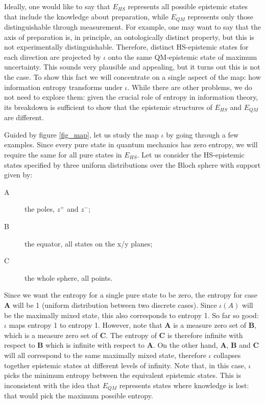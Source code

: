 \documentclass[twocolumn,prl,floatfix,superscriptaddress]{revtex4-2}
\begin{document}
Ideally, one would like to say that $E_{HS}$ represents all possible epistemic states that include the knowledge about preparation, while $E_{QM}$ represents only those distinguishable through measurement. For example, one may want to say that the axis of preparation is, in principle, an ontologically distinct property, but this is not experimentally distinguishable. Therefore, distinct HS-epistemic states for each direction are projected by $\iota$ onto the same QM-epistemic state of maximum uncertainty. This sounds very plausible and appealing, but it turns out this is not the case. To show this fact we will concentrate on a single aspect of the map: how information entropy transforms under $\iota$. While there are other problems, we do not need to explore them: given the crucial role of entropy in information theory, its breakdown is sufficient to show that the epistemic structures of $E_{HS}$ and $E_{QM}$ are different.

Guided by figure \ref{fig_map}, let us study the map $\iota$ by going through a few examples. Since every pure state in quantum mechanics has zero entropy, we will require the same for all pure states in $E_{HS}$. Let us consider the HS-epistemic states specified by three uniform distributions over the Bloch sphere with support given by:
\begin{description}
	\item[A] the poles, $z^+$ and $z^-$;
	\item[B] the equator, all states on the x/y planes;
	\item[C] the whole sphere, all points.
\end{description}
Since we want the entropy for a single pure state to be zero, the entropy for case \textbf{A} will be 1 (uniform distribution between two discrete cases). Since $\iota(A)$ will be the maximally mixed state, this also corresponds to entropy 1. So far so good: $\iota$ maps entropy 1 to entropy 1. However, note that \textbf{A} is a measure zero set of \textbf{B}, which is a measure zero set of \textbf{C}. The entropy of \textbf{C} is therefore infinite with respect to \textbf{B} which is infinite with respect to \textbf{A}. On the other hand, \textbf{A}, \textbf{B} and \textbf{C} will all correspond to the same maximally mixed state, therefore $\iota$ collapses together epistemic states at different levels of infinity. Note that, in this case, $\iota$ picks the minimum entropy between the equivalent epistemic states. This is inconsistent with the idea that $E_{QM}$ represents states where knowledge is lost: that would pick the maximum possible entropy.
\end{document}
